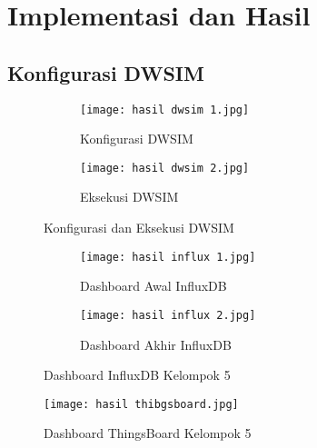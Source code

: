 \documentclass[a4paper, 12pt]{article}
\begin{document}
\section{Implementasi dan Hasil}

\subsection{Konfigurasi DWSIM}


\begin{figure}[htbp] %
    \centering
    \begin{subfigure}[b]{0.48\textwidth}
        \texttt{[image: hasil dwsim 1.jpg]}
        \caption{Konfigurasi DWSIM}
    \end{subfigure}
    \hfill
    \begin{subfigure}[b]{0.48\textwidth}
        \texttt{[image: hasil dwsim 2.jpg]}
        \caption{Eksekusi DWSIM}
    \end{subfigure}
    \caption{Konfigurasi dan Eksekusi DWSIM}
\end{figure}

\begin{figure}[htbp] %
    \centering
    \begin{subfigure}[b]{0.48\textwidth}
        \texttt{[image: hasil influx 1.jpg]}
        \caption{Dashboard Awal InfluxDB}
    \end{subfigure}
    \hfill
    \begin{subfigure}[b]{0.48\textwidth}
        \texttt{[image: hasil influx 2.jpg]}
        \caption{Dashboard Akhir InfluxDB} 
    \end{subfigure}
    \caption{Dashboard InfluxDB Kelompok 5}
\end{figure}

\begin{figure}[htbp] %
    \centering
    \texttt{[image: hasil thibgsboard.jpg]}
    \caption{Dashboard ThingsBoard Kelompok 5}
\end{figure}
\end{document}
